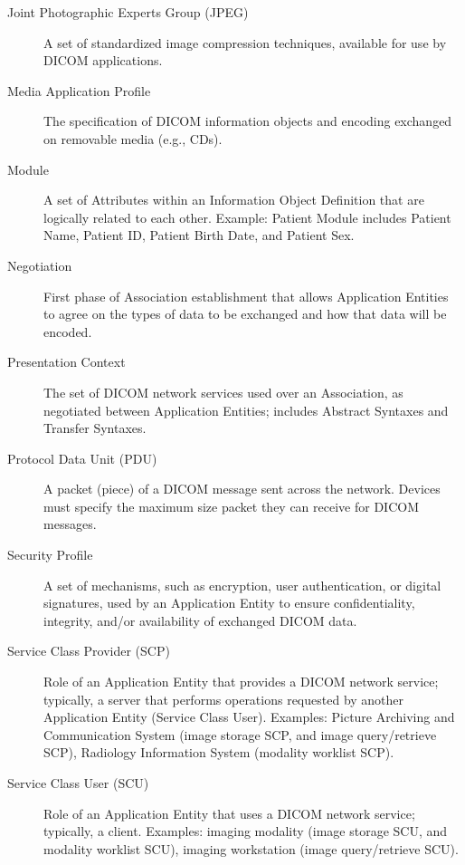 \documentclass[12pt, letterpaper]{article}
\begin{document}
\begin{description}
    \item [Joint Photographic Experts Group (JPEG)] A set of standardized image compression techniques, available for use by \gls{DICOM} applications.

    \item [Media Application Profile] The specification of \gls{DICOM} information objects and encoding exchanged on removable media (e.g., CDs).

    \item [Module] A set of Attributes within an Information Object Definition that are logically related to each other.
        Example: Patient Module includes Patient Name, Patient ID, Patient Birth Date, and Patient Sex.

    \item [Negotiation] First phase of Association establishment that allows Application Entities to agree on the types of data to be exchanged and how that data will be encoded. 

    \item [Presentation Context] The set of \gls{DICOM} network services used over an Association, as negotiated between Application Entities; includes Abstract Syntaxes and Transfer Syntaxes.

    \item [Protocol Data Unit (PDU)] A packet (piece) of a \gls{DICOM} message sent across the network. Devices must specify the maximum size packet they can receive for \gls{DICOM} messages.

    \item [Security Profile] A set of mechanisms, such as encryption, user authentication, or digital signatures, used by an Application Entity to ensure confidentiality, integrity, and/or availability of exchanged \gls{DICOM} data.

    \item [Service Class Provider (SCP)] Role of an Application Entity that provides a \gls{DICOM} network service; typically, a server that performs operations requested by another Application Entity (Service Class User).
        Examples: Picture Archiving and Communication System (image storage \gls{SCP}, and image query/retrieve \gls{SCP}), Radiology Information System (modality worklist \gls{SCP}).

    \item [Service Class User (SCU)] Role of an Application Entity that uses a \gls{DICOM} network service; typically, a client. 
        Examples: imaging modality (image storage \gls{SCU}, and modality worklist \gls{SCU}), imaging workstation (image query/retrieve \gls{SCU}).


\end{description}
\end{document}
